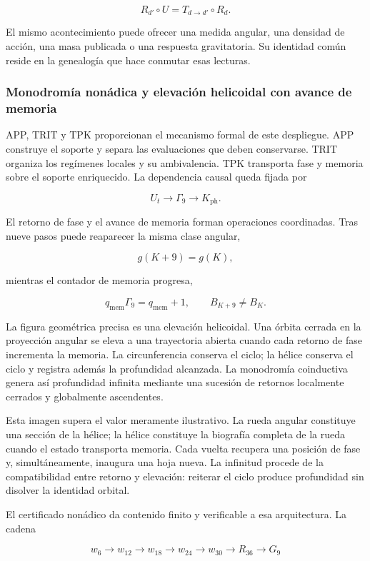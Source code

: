 \[
R_{d'}\circ U
=
T_{d\to d'}\circ R_d.
\]

El mismo acontecimiento puede ofrecer una medida angular, una densidad de acción, una masa publicada o una respuesta gravitatoria. Su identidad común reside en la genealogía que hace conmutar esas lecturas.

\subsubsection{Monodromía nonádica y elevación helicoidal con avance de memoria}

APP, TRIT y TPK proporcionan el mecanismo formal de este despliegue. APP construye el soporte y separa las evaluaciones que deben conservarse. TRIT organiza los regímenes locales y su ambivalencia. TPK transporta fase y memoria sobre el soporte enriquecido. La dependencia causal queda fijada por

\[
U_t\longrightarrow \Gamma_9\longrightarrow K_{\mathrm{ph}}.
\]

El retorno de fase y el avance de memoria forman operaciones coordinadas. Tras nueve pasos puede reaparecer la misma clase angular,

\[
g(K+9)=g(K),
\]

mientras el contador de memoria progresa,

\[
q_{\mathrm{mem}}\Gamma_9=q_{\mathrm{mem}}+1,
\qquad
B_{K+9}\neq B_K.
\]

La figura geométrica precisa es una elevación helicoidal. Una órbita cerrada en la proyección angular se eleva a una trayectoria abierta cuando cada retorno de fase incrementa la memoria. La circunferencia conserva el ciclo; la hélice conserva el ciclo y registra además la profundidad alcanzada. La monodromía coinductiva genera así profundidad infinita mediante una sucesión de retornos localmente cerrados y globalmente ascendentes.

Esta imagen supera el valor meramente ilustrativo. La rueda angular constituye una sección de la hélice; la hélice constituye la biografía completa de la rueda cuando el estado transporta memoria. Cada vuelta recupera una posición de fase y, simultáneamente, inaugura una hoja nueva. La infinitud procede de la compatibilidad entre retorno y elevación: reiterar el ciclo produce profundidad sin disolver la identidad orbital.

El certificado nonádico da contenido finito y verificable a esa arquitectura. La cadena

\[
w_6\longrightarrow w_{12}\longrightarrow w_{18}\longrightarrow
w_{24}\longrightarrow w_{30}\longrightarrow R_{36}\longrightarrow G_9
\]

